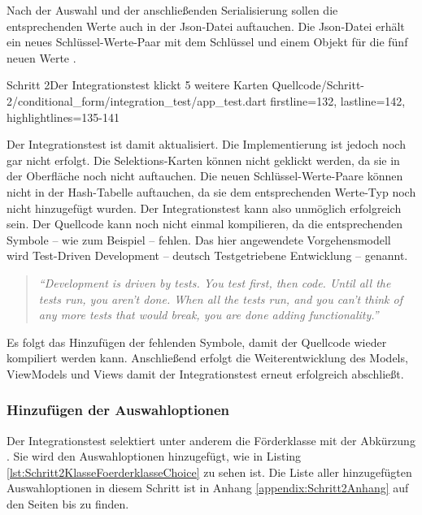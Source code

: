 Nach der Auswahl und der anschließenden Serialisierung sollen die entsprechenden Werte auch in der Json-Datei auftauchen.
Die Json-Datei erhält ein neues Schlüssel-Werte-Paar mit dem Schlüssel  und einem Objekt für die fünf neuen Werte .

\begin{alexlisting}{Schritt 2}{Der Integrationstest klickt 5 weitere Karten}
  {Quellcode/Schritt-2/conditional_form/integration_test/app_test.dart}
  {firstline=132, lastline=142, highlightlines={135-141}}
  \label{lst:Schritt2ExpectedJson}
\end{alexlisting}

Der Integrationstest ist damit aktualisiert.
Die Implementierung ist jedoch noch gar nicht erfolgt.
Die Selektions-Karten können nicht geklickt werden, da sie in der Oberfläche noch nicht auftauchen.
Die neuen Schlüssel-Werte-Paare können nicht in der Hash-Tabelle auftauchen, da sie dem entsprechenden Werte-Typ noch nicht hinzugefügt wurden.
Der Integrationstest kann also unmöglich erfolgreich sein.
Der Quellcode kann noch nicht einmal kompilieren, da die entsprechenden Symbole -- wie zum Beispiel  -- fehlen.
Das hier angewendete Vorgehensmodell wird Test-Driven Development -- deutsch Testgetriebene Entwicklung -- genannt.
 


\begin{quotation}
\textit{\enquote{Development is driven by tests.
You test first, then code.
Until all the tests run, you aren't
done.
When all the tests run, and you can't think of any more tests that would break, you
are done adding functionality.}}


\end{quotation}

Es folgt das Hinzufügen der fehlenden Symbole, damit der Quellcode wieder kompiliert werden kann.
Anschließend erfolgt die Weiterentwicklung des Models, ViewModels und Views damit der Integrationstest erneut erfolgreich abschließt.


\subsubsection{Hinzufügen der Auswahloptionen}

Der Integrationstest selektiert unter anderem die Förderklasse mit der Abkürzung . Sie wird den Auswahloptionen hinzugefügt, wie in Listing \ref{lst:Schritt2KlasseFoerderklasseChoice} zu sehen ist.
Die Liste aller hinzugefügten Auswahloptionen in diesem Schritt ist in Anhang \ref{appendix:Schritt2Anhang} auf den Seiten \pageref{lst:Schritt2FoerderklasseChoicesKategorieChoices} bis \pageref{lst:Schritt2hauptzielsetzungLandChoices} zu finden.

